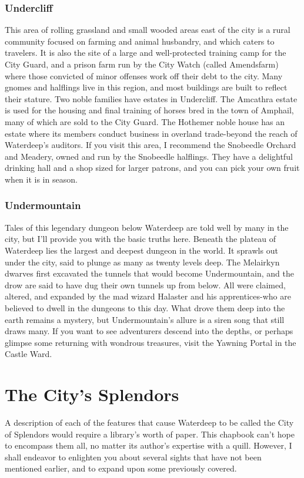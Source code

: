 \documentclass[10pt,a4paper,twoside,twocolumn,openany,nodeprecatedcode]{dndbook}
\begin{document}
\subsubsection{Undercliff}
This area of rolling grassland and small wooded areas east of the city is a rural community focused on farming and animal husbandry, and which caters to travelers. It is also the site of a large and well-protected training camp for the City Guard, and a prison farm run by the City Watch (called Amendsfarm) where those convicted of minor offenses work off their debt to the city. Many gnomes and halflings live in this region, and most buildings are built to reflect their stature.
Two noble families have estates in Undercliff. The Amcathra estate is used for the housing and final training of horses bred in the town of Amphail, many of which are sold to the City Guard. The Hothemer noble house has an estate where its members conduct business in overland trade-beyond the reach of Waterdeep's auditors.
If you visit this area, I recommend the Snobeedle Orchard and Meadery, owned and run by the Snobeedle halflings. They have a delightful drinking hall and a shop sized for larger patrons, and you can pick your own fruit when it is in season.
\subsubsection{Undermountain}
Tales of this legendary dungeon below Waterdeep are told well by many in the city, but I'll provide you with the basic truths here.
Beneath the plateau of Waterdeep lies the largest and deepest dungeon in the world. It sprawls out under the city, said to plunge as many as twenty levels deep. The Melairkyn dwarves first excavated the tunnels that would become Undermountain, and the drow are said to have dug their own tunnels up from below. All were claimed, altered, and expanded by the mad wizard Halaster and his apprentices-who are believed to dwell in the dungeons to this day. What drove them deep into the earth remains a mystery, but Undermountain's allure is a siren song that still draws many. If you want to see adventurers descend into the depths, or perhaps glimpse some returning with wondrous treasures, visit the Yawning Portal in the Castle Ward.
\section{The City's Splendors}
A description of each of the features that cause Waterdeep to be called the City of Splendors would require a library's worth of paper. This chapbook can't hope to encompass them all, no matter its author's expertise with a quill. However, I shall endeavor to enlighten you about several sights that have not been mentioned earlier, and to expand upon some previously covered.
\end{document}
